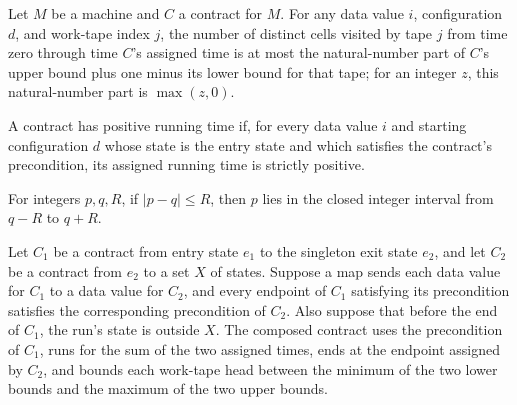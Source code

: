 \begin{theorem}
\label{Turing.Contract.spaceUsedByTape_le}
\leanok
{}
Let $M$ be a machine and $C$ a contract for $M$. For any data value $i$, configuration
$d$, and work-tape index $j$, the number of distinct cells visited by tape $j$ from time
zero through time $C$’s assigned time is at most the natural-number part of $C$’s upper
bound plus one minus its lower bound for that tape; for an integer $z$, this
natural-number part is $\max(z,0)$.
\end{theorem}

\begin{definition}
\label{Turing.Contract.Positive}
\leanok
{}
A contract has positive running time if, for every data value $i$ and starting
configuration $d$ whose state is the entry state and which satisfies the contract's
precondition, its assigned running time is strictly positive.
\end{definition}

\begin{theorem}
\label{Turing.Contract.mem_Icc_of_abs_le}
\leanok
{}
For integers $p,q,R$, if $|p-q|\le R$, then $p$ lies in the closed integer interval from
$q-R$ to $q+R$.
\end{theorem}

\begin{definition}
\label{Turing.Contract.trans}
\leanok
{}
Let $C_1$ be a contract from entry state $e_1$ to the singleton exit state $e_2$, and
let $C_2$ be a contract from $e_2$ to a set $X$ of states. Suppose a map sends each data
value for $C_1$ to a data value for $C_2$, and every endpoint of $C_1$ satisfying its
precondition satisfies the corresponding precondition of $C_2$. Also suppose that before
the end of $C_1$, the run's state is outside $X$. The composed contract uses the
precondition of $C_1$, runs for the sum of the two assigned times, ends at the endpoint
assigned by $C_2$, and bounds each work-tape head between the minimum of the two lower
bounds and the maximum of the two upper bounds.
\end{definition}

